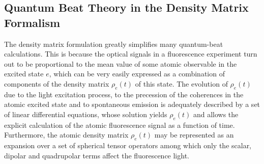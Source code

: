 \documentclass[11pt]{article}
\begin{document}
\newpage























\begin{appendices}
	


\section{Quantum Beat Theory in the Density Matrix Formalism \cite{haroche}}\label{app:quantum_beats}



The density matrix formulation greatly simplifies many quantum-beat calculations. This is because the optical signals in a fluorescence experiment turn out to be proportional to the mean value of some atomic observable in the excited state $e$, which can be very easily expressed as a combination of components of the density matrix $\rho_e(t)$ of this state. The evolution of $\rho_e(t)$ due to the light excitation process, to the precession of the coherences
in the atomic excited state and to spontaneous emission is adequately described by a set of linear differential equations, whose solution yields $\rho_e(t)$ and allows the explicit calculation of the atomic fluorescence signal as a function of time. Furthermore, the atomic density matrix $\rho_e(t)$ may be represented as an expansion over a set of spherical tensor operators
among which only the scalar, dipolar and quadrupolar terms affect the fluorescence light.  


\end{appendices}
\end{document}
